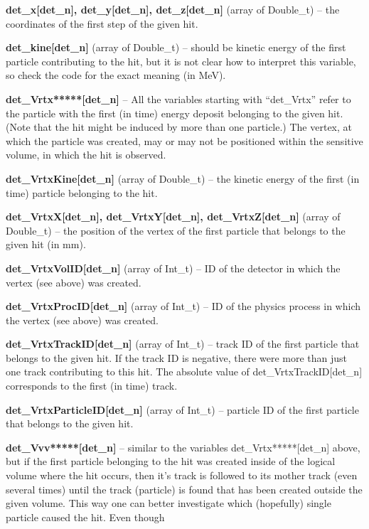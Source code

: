 \documentclass[twoside]{dis04}
\begin{document}
\begin{description}
\item{\bf det\_x[det\_n], det\_y[det\_n], det\_z[det\_n]} (array of Double\_t) -- the coordinates of the first step of the given hit.
\item{\bf det\_kine[det\_n]} (array of Double\_t) -- should be kinetic energy of the first particle contributing 
	to the hit, but it is not clear how to interpret this variable, so check the
	code for the exact meaning (in MeV).
\item{\bf det\_Vrtx*****[det\_n]} -- All the variables starting with ``det\_Vrtx'' refer to the particle with the first (in time) energy deposit
         belonging to the given hit.  (Note that the hit might be induced by more than one particle.)  The vertex, at which
         the particle was created, may or may not be positioned within the sensitive volume, in which the hit is observed.
\item{\bf det\_VrtxKine[det\_n]} (array of Double\_t) -- the kinetic energy of the first (in time) particle belonging to the hit.
\item{\bf det\_VrtxX[det\_n], det\_VrtxY[det\_n], det\_VrtxZ[det\_n]}  (array of Double\_t) -- the position of the vertex of
	the first particle that belongs to the given hit (in mm). 
\item{\bf det\_VrtxVolID[det\_n]} (array of Int\_t) -- ID of the detector in which the vertex (see above) was created.
\item{\bf det\_VrtxProcID[det\_n]} (array of Int\_t) -- ID of the physics process in which the vertex (see above) was created.
\item{\bf det\_VrtxTrackID[det\_n]} (array of Int\_t) -- track ID of the first particle that belongs to the given hit.
	If the track ID is negative, there were more than just one track contributing to this hit.  The absolute value
        of det\_VrtxTrackID[det\_n] corresponds to the first (in time) track.
\item{\bf det\_VrtxParticleID[det\_n]} (array of Int\_t) -- particle ID of the first particle that belongs to the given hit.
\item{\bf det\_Vvv*****[det\_n]} -- similar to the variables det\_Vrtx*****[det\_n] above, but if the first particle 
	belonging to the hit was created inside of the logical volume where the hit occurs, then it's track is followed
        to its mother track (even several times) until the track (particle) is found that has been created outside the
        given volume.  This way one can better investigate which (hopefully) single particle caused the hit.  Even though

\end{description}
\end{document}
